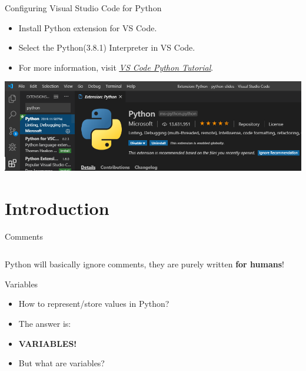      \begin{frame}{Configuring Visual Studio Code for Python}
        \LARGE
        \begin{itemize}
            \item Install Python extension for VS Code.
            \pause
            \item Select the Python(3.8.1) Interpreter in VS Code.
            \pause
            \item For more information, visit \href{https://code.visualstudio.com/docs/python/python-tutorial}{\underline{\textit{VS Code Python Tutorial}}}.
        \end{itemize}
        \centering
        \includegraphics[width=0.75\linewidth]{images/python_extension.PNG}						
     \end{frame}

	\section{Introduction}
		
		\begin{frame}{Comments}
			\LARGE
			\inputminted[frame=single,framesep=2pt]{python3}{code-examples/comments.py}
			Python will basically ignore comments, they are purely written \textbf{for humans}!
		\end{frame}

		\begin{frame}{Variables}
			\LARGE
			\begin{itemize}
				\pause
				\item How to represent/store values in Python?
				\pause
				\item The answer is:
				\item \huge{\textbf{VARIABLES!}}
				\vspace{5mm}
				\pause
				\item But what are variables?
			\end{itemize}
		\end{frame}
		
